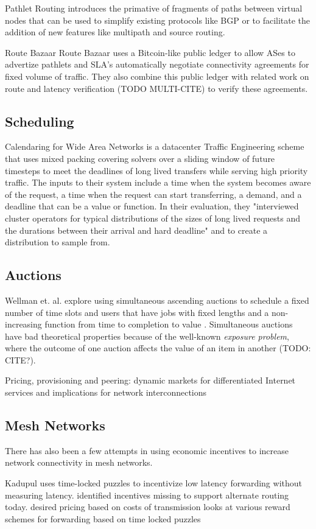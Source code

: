 Pathlet Routing \cite{pathlet09} introduces the primative of fragments of paths between virtual nodes that can be used to simplify existing protocols like BGP or to facilitate the addition of new features like multipath and source routing.

Route Bazaar \cite{routebazaar15}
Route Bazaar uses a Bitcoin-like public ledger to allow ASes to advertize pathlets and SLA's automatically negotiate connectivity agreements for fixed volume of traffic. They also combine this public ledger with related work on route and latency verification (TODO MULTI-CITE) to verify these agreements.


\subsection{Scheduling}

Calendaring for Wide Area Networks \cite{tempus14}
is a datacenter Traffic Engineering scheme that uses mixed packing covering solvers over a sliding window of future timesteps to meet the deadlines of long lived transfers while serving high priority traffic.
The inputs to their system include a time when the system becomes aware of the request, a time when the request can start transferring, a demand, and a deadline that can be a value or function.
In their evaluation, they "interviewed cluster operators for typical distributions of the sizes of long lived requests and the durations between their arrival and hard deadline" and to create a distribution to sample from.

\subsection{Auctions}
Wellman et. al. explore using simultaneous ascending auctions to schedule a fixed number of time slots and users that have jobs with fixed lengths and a non-increasing function from time to completion to value \cite{wellman01, wellman05}.
Simultaneous auctions have bad theoretical properties because of the well-known \emph{exposure problem}, where the outcome of one auction affects the value of an item in another (TODO: CITE?).

Pricing, provisioning and peering: dynamic markets for differentiated Internet services and implications for network interconnections \cite{markets00}

\subsection{Mesh Networks}
There has also been a few attempts in using economic incentives to increase network connectivity in mesh networks.

Kadupul \cite{kadupul15} uses time-locked puzzles to incentivize low latency forwarding without measuring latency.
identified incentives missing to support alternate routing today. desired pricing based on costs of transmission
looks at various reward schemes for forwarding based on time locked puzzles
